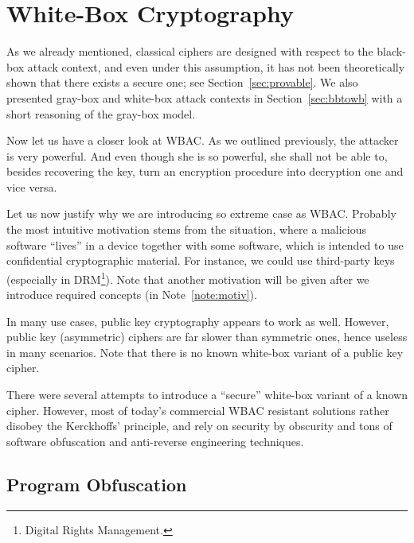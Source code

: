 \section{White-Box Cryptography}
\label{sec:wbc}

As we already mentioned, classical ciphers are designed with respect to the black-box attack context, and even under this assumption, it has not been theoretically shown that there exists a secure one; see Section~\ref{sec:provable}. We also presented gray-box and white-box attack contexts in Section~\ref{sec:bbtowb} with a short reasoning of the gray-box model.

Now let us have a closer look at WBAC. As we outlined previously, the attacker is very powerful. And even though she is so powerful, she shall not be able to, besides recovering the key, turn an encryption procedure into decryption one and vice versa.

Let us now justify why we are introducing so extreme case as WBAC. Probably the most intuitive motivation stems from the situation, where a malicious software ``lives'' in a device together with some software, which is intended to use confidential cryptographic material. For instance, we could use third-party keys (especially in DRM\footnote{Digital Rights Management.}). Note that another motivation will be given after we introduce required concepts (in Note~\ref{note:motiv}).

In many use cases, public key cryptography appears to work as well. However, public key (asymmetric) ciphers are far slower than symmetric ones, hence useless in many scenarios. Note that there is no known white-box variant of a public key cipher.

There were several attempts to introduce a ``secure'' white-box variant of a known cipher. However, most of today's commercial WBAC resistant solutions rather disobey the Kerckhoffs' principle, and rely on security by obscurity and tons of software obfuscation and anti-reverse engineering techniques.



\subsection{Program Obfuscation}
\label{sec:impos}

